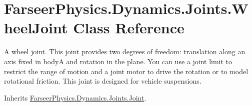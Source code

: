 \hypertarget{class_farseer_physics_1_1_dynamics_1_1_joints_1_1_wheel_joint}{\section{Farseer\+Physics.\+Dynamics.\+Joints.\+Wheel\+Joint Class Reference}
\label{class_farseer_physics_1_1_dynamics_1_1_joints_1_1_wheel_joint}
}


A wheel joint. This joint provides two degrees of freedom\+: translation along an axis fixed in body\+A and rotation in the plane. You can use a joint limit to restrict the range of motion and a joint motor to drive the rotation or to model rotational friction. This joint is designed for vehicle suspensions.  




Inherits \hyperlink{class_farseer_physics_1_1_dynamics_1_1_joints_1_1_joint}{Farseer\+Physics.\+Dynamics.\+Joints.\+Joint}.

